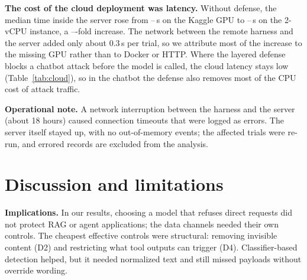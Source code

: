 \documentclass[a4paper,fleqn]{cas-dc}
\begin{document}
\textbf{The cost of the cloud deployment was latency.}
Without defense, the median time inside the server rose from \cloudSrvKMin--\cloudSrvKMax\,s on the Kaggle GPU to \cloudSrvAMin--\cloudSrvAMax\,s on the 2-vCPU instance, a \cloudRatioMin--\cloudRatioMax-fold increase.
The network between the remote harness and the server added only about 0.3\,s per trial, so we attribute most of the increase to the missing GPU rather than to Docker or HTTP.
Where the layered defense blocks a chatbot attack before the model is called, the cloud latency stays low (Table~\ref{tab:cloud}), so in the chatbot the defense also removes most of the CPU cost of attack traffic.

\textbf{Operational note.}
A network interruption between the harness and the server (about 18 hours) caused connection timeouts that were logged as errors.
The server itself stayed up, with no out-of-memory events; the affected trials were re-run, and errored records are excluded from the analysis.

\section{Discussion and limitations}\label{sec:discussion}
\textbf{Implications.}
In our results, choosing a model that refuses direct requests did not protect RAG or agent applications; the data channels needed their own controls.
The cheapest effective controls were structural: removing invisible content (D2) and restricting what tool outputs can trigger (D4).
Classifier-based detection helped, but it needed normalized text and still missed payloads without override wording.
\end{document}
